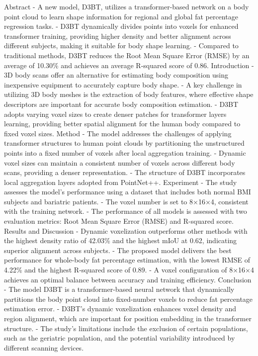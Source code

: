 \documentclass[conference, 12pt]{IEEEtran}
\begin{document}
Abstract
- A new model, D3BT, utilizes a transformer-based network on a body point cloud to learn shape information for regional and global fat percentage regression tasks.
- D3BT dynamically divides points into voxels for enhanced transformer training, providing higher density and better alignment across different subjects, making it suitable for body shape learning.
- Compared to traditional methods, D3BT reduces the Root Mean Square Error (RMSE) by an average of 10.30\% and achieves an average R-squared score of 0.86.
Introduction
- 3D body scans offer an alternative for estimating body composition using inexpensive equipment to accurately capture body shape.
- A key challenge in utilizing 3D body meshes is the extraction of body features, where effective shape descriptors are important for accurate body composition estimation.
- D3BT adopts varying voxel sizes to create denser patches for transformer layers learning, providing better spatial alignment for the human body compared to fixed voxel sizes.
Method
- The model addresses the challenges of applying transformer structures to human point clouds by partitioning the unstructured points into a fixed number of voxels after local aggregation training.
- Dynamic voxel sizes can maintain a consistent number of voxels across different body scans, providing a denser representation.
- The structure of D3BT incorporates local aggregation layers adopted from PointNet++.
Experiment
- The study assesses the model’s performance using a dataset that includes both normal BMI subjects and bariatric patients.
- The voxel number is set to 8×16×4, consistent with the training network.
- The performance of all models is assessed with two evaluation metrics: Root Mean Square Error (RMSE) and R-squared score.
Results and Discussion
- Dynamic voxelization outperforms other methods with the highest density ratio of 42.03\% and the highest mIoU at 0.62, indicating superior alignment across subjects.
- The proposed model delivers the best performance for whole-body fat percentage estimation, with the lowest RMSE of 4.22\% and the highest R-squared score of 0.89.
- A voxel configuration of 8×16×4 achieves an optimal balance between accuracy and training efficiency.
Conclusion
- The model D3BT is a transformer-based neural network that dynamically partitions the body point cloud into fixed-number voxels to reduce fat percentage estimation error.
- D3BT’s dynamic voxelization enhances voxel density and region alignment, which are important for position embedding in the transformer structure.
- The study's limitations include the exclusion of certain populations, such as the geriatric population, and the potential variability introduced by different scanning devices.
\end{document}
